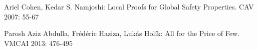 \begin{enumerate}
Ariel Cohen, Kedar S. Namjoshi:
Local Proofs for Global Safety Properties. CAV 2007: 55-67
~

Parosh Aziz Abdulla, Frédéric Haziza, Lukás Holík:
All for the Price of Few. VMCAI 2013: 476-495


\end{enumerate}
